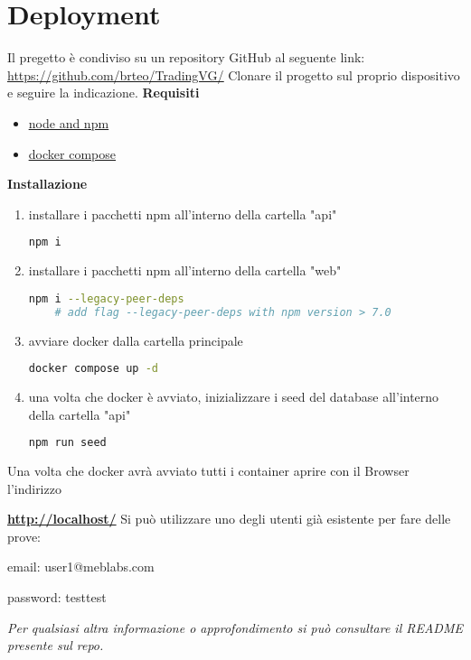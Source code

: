 \section{Deployment}
Il pregetto è condiviso su un repository GitHub al seguente link:
\newline{\\}
\noindent
\underline{\href{https://github.com/brteo/TradingVG/}{https://github.com/brteo/TradingVG/}}
\newline{\\}
\noindent
Clonare il progetto sul proprio dispositivo e seguire la indicazione.
\newline{\\}
\noindent
\textbf{Requisiti}
\begin{itemize}
	\item{\underline{\href{https://docs.npmjs.com/downloading-and-installing-node-js-and-npm}{node and npm}}}
	\item{\underline{\href{https://docs.docker.com/compose/install/}{docker compose}}}
\end{itemize}
\noindent
\textbf{Installazione}
\begin{enumerate}
	\item{installare i pacchetti npm all'interno della cartella "api"}
\begin{lstlisting}[language=bash]
	npm i
\end{lstlisting}		
	\item{installare i pacchetti npm all'interno della cartella "web"}
\begin{lstlisting}[language=bash]
	npm i --legacy-peer-deps
	# add flag --legacy-peer-deps with npm version > 7.0
\end{lstlisting}
	\item{avviare docker dalla cartella principale}
\begin{lstlisting}[language=bash]
	docker compose up -d
\end{lstlisting}
	\item{una volta che docker è avviato, inizializzare i seed del database all'interno della cartella "api"}
\begin{lstlisting}[language=bash]
	npm run seed
\end{lstlisting}
\end{enumerate}
\noindent
Una volta che docker avrà avviato tutti i container aprire con il Browser l'indirizzo

\textbf{\href{http://localhost/}{http://localhost/}}
\newline{\\}
\noindent
Si può utilizzare uno degli utenti già esistente per fare delle prove:

email: user1@meblabs.com

password: testtest

\bigbreak
\noindent
\textit{Per qualsiasi altra informazione o approfondimento si può consultare il README presente sul repo.}